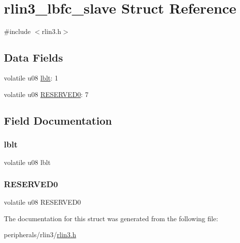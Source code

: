 \hypertarget{structrlin3__lbfc__slave}{}\section{rlin3\+\_\+lbfc\+\_\+slave Struct Reference}
\label{structrlin3__lbfc__slave}


{\ttfamily \#include $<$rlin3.\+h$>$}

\subsection*{Data Fields}
\begin{DoxyCompactItemize}
\item 
volatile u08 \mbox{\hyperlink{structrlin3__lbfc__slave_a30ef2eda97d09747234efb92c345e6e0}{lblt}}\+: 1
\item 
volatile u08 \mbox{\hyperlink{structrlin3__lbfc__slave_a59c0b30ccfb89f1b34e9682741859abd}{R\+E\+S\+E\+R\+V\+E\+D0}}\+: 7
\end{DoxyCompactItemize}


\subsection{Field Documentation}
\mbox{\label{structrlin3__lbfc__slave_a30ef2eda97d09747234efb92c345e6e0}} 
\subsubsection{\texorpdfstring{lblt}{lblt}}
{\footnotesize\ttfamily volatile u08 lblt}

\mbox{\label{structrlin3__lbfc__slave_a59c0b30ccfb89f1b34e9682741859abd}} 
\subsubsection{\texorpdfstring{R\+E\+S\+E\+R\+V\+E\+D0}{RESERVED0}}
{\footnotesize\ttfamily volatile u08 R\+E\+S\+E\+R\+V\+E\+D0}



The documentation for this struct was generated from the following file\+:\begin{DoxyCompactItemize}
\item 
peripherals/rlin3/\mbox{\hyperlink{rlin3_8h}{rlin3.\+h}}\end{DoxyCompactItemize}

